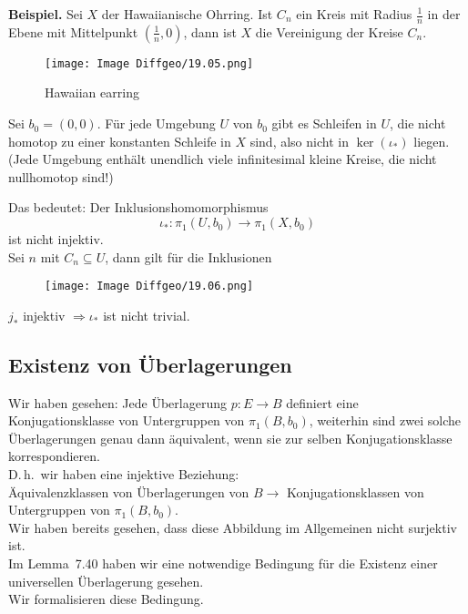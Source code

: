 \documentclass[fleqn, 12pt, letterpaper]{article}
\begin{document}
\textbf{Beispiel.}
Sei \( X \) der Hawaiianische Ohrring. Ist \( C_n \) ein Kreis mit Radius \( \frac{1}{n} \) in der Ebene mit Mittelpunkt \( \left(\frac{1}{n}, 0\right) \), dann ist \( X \) die Vereinigung der Kreise \( C_n \).
  \begin{figure}[H]
    \centering
    \texttt{[image: Image Diffgeo/19.05.png]}
	\caption{Hawaiian earring}
 \end{figure}

Sei \( b_0 = (0, 0) \). Für jede Umgebung \( U \) von \( b_0 \) gibt es Schleifen in \( U \), die nicht homotop zu einer konstanten Schleife in \( X \) sind, also nicht in \( \ker(\iota_*) \) liegen. (Jede Umgebung enthält unendlich viele infinitesimal kleine Kreise, die nicht nullhomotop sind!)

Das bedeutet: Der Inklusionshomomorphismus
\[
\iota_* : \pi_1(U, b_0) \to \pi_1(X, b_0)
\]
ist nicht injektiv.\\

Sei \( n \) mit \( C_n \subseteq U \), dann gilt für die Inklusionen
  \begin{figure}[H]
    \centering
    \texttt{[image: Image Diffgeo/19.06.png]}
 \end{figure}

\( j_* \) injektiv \( \Rightarrow \iota_* \) ist nicht trivial.


\subsection{Existenz von Überlagerungen}

Wir haben gesehen: Jede Überlagerung \( p : E \to B \) definiert eine Konjugationsklasse von Untergruppen von \( \pi_1(B, b_0) \), weiterhin sind zwei solche Überlagerungen genau dann äquivalent, wenn sie zur selben Konjugationsklasse korrespondieren.\\

D.\,h.\ wir haben eine injektive Beziehung:\\
Äquivalenzklassen von Überlagerungen von $B \rightarrow$ Konjugationsklassen von Untergruppen von $\pi_1(B, b_0)$.\\

Wir haben bereits gesehen, dass diese Abbildung im Allgemeinen nicht surjektiv ist.\\
Im Lemma~7.40 haben wir eine notwendige Bedingung für die Existenz einer universellen Überlagerung gesehen.\\
Wir formalisieren diese Bedingung.\\
\end{document}
